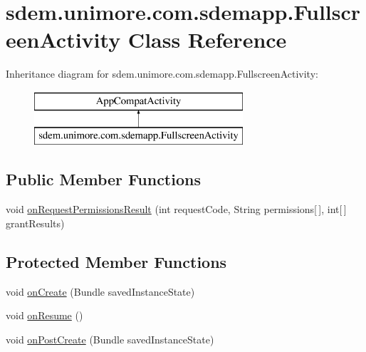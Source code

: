 \hypertarget{classsdem_1_1unimore_1_1com_1_1sdemapp_1_1_fullscreen_activity}{\section{sdem.\+unimore.\+com.\+sdemapp.\+Fullscreen\+Activity Class Reference}
\label{classsdem_1_1unimore_1_1com_1_1sdemapp_1_1_fullscreen_activity}
}
Inheritance diagram for sdem.\+unimore.\+com.\+sdemapp.\+Fullscreen\+Activity\+:\begin{figure}[H]
\begin{center}
\leavevmode
\includegraphics[height=2.000000cm]{classsdem_1_1unimore_1_1com_1_1sdemapp_1_1_fullscreen_activity}
\end{center}
\end{figure}
\subsection*{Public Member Functions}
\begin{DoxyCompactItemize}
\item 
void \hyperlink{classsdem_1_1unimore_1_1com_1_1sdemapp_1_1_fullscreen_activity_aa00cf64d5669932c3b4ca55e3dee382c}{on\+Request\+Permissions\+Result} (int request\+Code, String permissions\mbox{[}$\,$\mbox{]}, int\mbox{[}$\,$\mbox{]} grant\+Results)
\end{DoxyCompactItemize}
\subsection*{Protected Member Functions}
\begin{DoxyCompactItemize}
\item 
void \hyperlink{classsdem_1_1unimore_1_1com_1_1sdemapp_1_1_fullscreen_activity_aa47fc4234b35e26366da2aeded279ed4}{on\+Create} (Bundle saved\+Instance\+State)
\item 
void \hyperlink{classsdem_1_1unimore_1_1com_1_1sdemapp_1_1_fullscreen_activity_ab4610475ff6a0a0099971f041a95f5ba}{on\+Resume} ()
\item 
void \hyperlink{classsdem_1_1unimore_1_1com_1_1sdemapp_1_1_fullscreen_activity_a6ce6eebdc04c389cedbb9f2a86214b8a}{on\+Post\+Create} (Bundle saved\+Instance\+State)
\end{DoxyCompactItemize}
